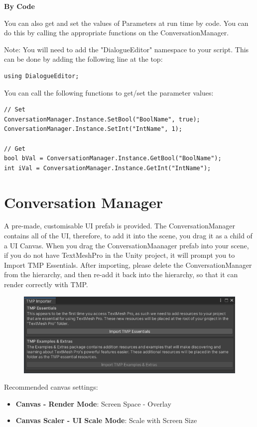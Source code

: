 \documentclass[a4paper,12pt]{article}
\begin{document}
\textbf{By Code}
\bigskip

You can also get and set the values of Parameters at run time by code. You can do this by calling the appropriate functions on the ConversationManager.
\newline

Note: You will need to add the "DialogueEditor" namespace to your script. This can be done by adding the following line at the top:
\bigskip

\begin{lstlisting}
using DialogueEditor;
\end{lstlisting}
\bigskip

You can call the following functions to get/set the parameter values:
\bigskip

\begin{lstlisting}
// Set
ConversationManager.Instance.SetBool("BoolName", true);
ConversationManager.Instance.SetInt("IntName", 1);

// Get
bool bVal = ConversationManager.Instance.GetBool("BoolName");
int iVal = ConversationManager.Instance.GetInt("IntName");
\end{lstlisting}
\bigskip

\newpage




\hypertarget{_conversationmanager}{}
\section{Conversation Manager}
A pre-made, customisable UI prefab is provided. The ConversationManager contains all of the UI, therefore, to add it into the scene, you drag it as a child of a UI Canvas. 
\newline
\newline
When you drag the ConversationMaanager prefab into your scene, if you do not have TextMeshPro in the Unity project, it will prompt you to Import TMP Essentials. After importing, please delete the ConversationManager from the hierarchy, and then re-add it back into the hierarchy, so that it can render correctly with TMP.
\newline
\begin{figure}[h]
\centering
\includegraphics[width=400pt, keepaspectratio]{img/ImportTMPEssentials.png}
\end{figure}
\newline
Recommended canvas settings:
\begin{itemize}
\setlength\itemsep{1pt}
	\item \textbf{Canvas - Render Mode}: Screen Space - Overlay
	\item \textbf{Canvas Scaler - UI Scale Mode}: Scale with Screen Size
\end{itemize}
\end{document}
